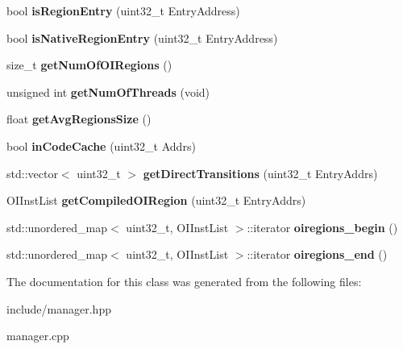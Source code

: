 \begin{DoxyCompactItemize}
\item 
bool {\bfseries is\+Region\+Entry} (uint32\+\_\+t Entry\+Address)\hypertarget{classdbt_1_1_manager_a4d242f39ec628913a6d98690bbacd385}{}\label{classdbt_1_1_manager_a4d242f39ec628913a6d98690bbacd385}

\item 
bool {\bfseries is\+Native\+Region\+Entry} (uint32\+\_\+t Entry\+Address)\hypertarget{classdbt_1_1_manager_ae65f7a5f6de52f561c212d426c275bdb}{}\label{classdbt_1_1_manager_ae65f7a5f6de52f561c212d426c275bdb}

\item 
size\+\_\+t {\bfseries get\+Num\+Of\+O\+I\+Regions} ()\hypertarget{classdbt_1_1_manager_aefb12ae46a7a7a8c244d9c19b961345f}{}\label{classdbt_1_1_manager_aefb12ae46a7a7a8c244d9c19b961345f}

\item 
unsigned int {\bfseries get\+Num\+Of\+Threads} (void)\hypertarget{classdbt_1_1_manager_abfb897878f4e3df8e726c7b131d4853d}{}\label{classdbt_1_1_manager_abfb897878f4e3df8e726c7b131d4853d}

\item 
float {\bfseries get\+Avg\+Regions\+Size} ()\hypertarget{classdbt_1_1_manager_ac8e3910a1f66330e64057f4ed956360c}{}\label{classdbt_1_1_manager_ac8e3910a1f66330e64057f4ed956360c}

\item 
bool {\bfseries in\+Code\+Cache} (uint32\+\_\+t Addrs)\hypertarget{classdbt_1_1_manager_a7f3ce92185f40d836012461b36dc53e6}{}\label{classdbt_1_1_manager_a7f3ce92185f40d836012461b36dc53e6}

\item 
std\+::vector$<$ uint32\+\_\+t $>$ {\bfseries get\+Direct\+Transitions} (uint32\+\_\+t Entry\+Addrs)\hypertarget{classdbt_1_1_manager_a25b04e3b86d130fe532e528a43f05f6a}{}\label{classdbt_1_1_manager_a25b04e3b86d130fe532e528a43f05f6a}

\item 
O\+I\+Inst\+List {\bfseries get\+Compiled\+O\+I\+Region} (uint32\+\_\+t Entry\+Addrs)\hypertarget{classdbt_1_1_manager_a22896dec9889a46438f2b77bdafc132a}{}\label{classdbt_1_1_manager_a22896dec9889a46438f2b77bdafc132a}

\item 
std\+::unordered\+\_\+map$<$ uint32\+\_\+t, O\+I\+Inst\+List $>$\+::iterator {\bfseries oiregions\+\_\+begin} ()\hypertarget{classdbt_1_1_manager_a0c2cf3bccc4dde0ae5ab1ef2c2a9408a}{}\label{classdbt_1_1_manager_a0c2cf3bccc4dde0ae5ab1ef2c2a9408a}

\item 
std\+::unordered\+\_\+map$<$ uint32\+\_\+t, O\+I\+Inst\+List $>$\+::iterator {\bfseries oiregions\+\_\+end} ()\hypertarget{classdbt_1_1_manager_a76e01c2319ced6943e7c448395da952d}{}\label{classdbt_1_1_manager_a76e01c2319ced6943e7c448395da952d}

\end{DoxyCompactItemize}


The documentation for this class was generated from the following files\+:\begin{DoxyCompactItemize}
\item 
include/manager.\+hpp\item 
manager.\+cpp\end{DoxyCompactItemize}
